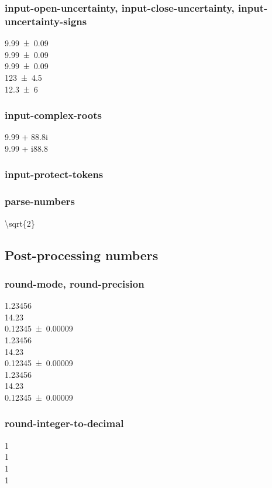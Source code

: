 \documentclass{article}
\begin{document}
\subsubsection{input-open-uncertainty, input-close-uncertainty, input-uncertainty-signs}
\num{9.99(9)}\\
\num{9.99 +- 0.09}\\
\num{9.99 \pm 0.09}\\
\num{123 +- 4.5}\\
\num{12.3 +- 6}\\

\subsubsection{input-complex-roots}
\num{9.99 + 88.8i} \\
\num{9.99 + i88.8}\\

\subsubsection{input-protect-tokens}

\subsubsection{parse-numbers}
\num[parse-numbers = false]{\sqrt{2}}\\

\subsection{Post-processing numbers}
\subsubsection{round-mode, round-precision}
{
\num{1.23456} \\
\num{14.23} \\
\num{0.12345(9)} \\
%
\num{1.23456} \\
\num{14.23} \\
\num{0.12345(9)} \\
%
\num{1.23456} \\
\num{14.23} \\
\num{0.12345(9)}\\
}
\subsubsection{round-integer-to-decimal}
{
\num[round-mode = figures]{1} \\
\num[round-mode = places]{1} \\
\num[round-mode = figures]{1} \\
\num[round-mode = places]{1}\\
}
\end{document}
